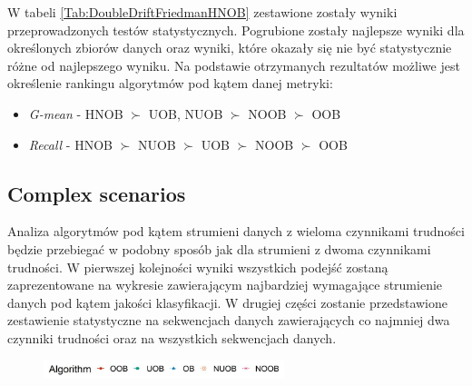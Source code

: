 \noindent W tabeli \ref{Tab:DoubleDriftFriedmanHNOB} zestawione zostały wyniki przeprowadzonych testów statystycznych. Pogrubione zostały najlepsze wyniki dla określonych zbiorów danych oraz wyniki, które okazały się nie być statystycznie różne od najlepszego wyniku. Na podstawie otrzymanych rezultatów możliwe jest określenie rankingu algorytmów pod kątem danej metryki:

\begin{itemize}
    \item \textit{G-mean} - HNOB $\succ$ UOB, NUOB $\succ$ NOOB $\succ$ OOB
    \item \textit{Recall} - HNOB $\succ$ NUOB $\succ$ UOB $\succ$ NOOB $\succ$ OOB
\end{itemize}

\subsection{Complex scenarios}

\noindent Analiza algorytmów pod kątem strumieni danych z wieloma czynnikami trudności będzie przebiegać w podobny sposób jak dla strumieni z dwoma czynnikami trudności. W pierwszej kolejności wyniki wszystkich podejść zostaną zaprezentowane na wykresie zawierającym najbardziej wymagające strumienie danych pod kątem jakości klasyfikacji. W drugiej części zostanie przedstawione zestawienie statystyczne na sekwencjach danych zawierających co najmniej dwa czynniki trudności oraz na wszystkich sekwencjach danych.

\newpage

\begin{figure}[h]
    \centering
    \includegraphics[width=7cm]{figures/algorithms_legend.JPG}
\end{figure}

\vspace{-1.2cm}

